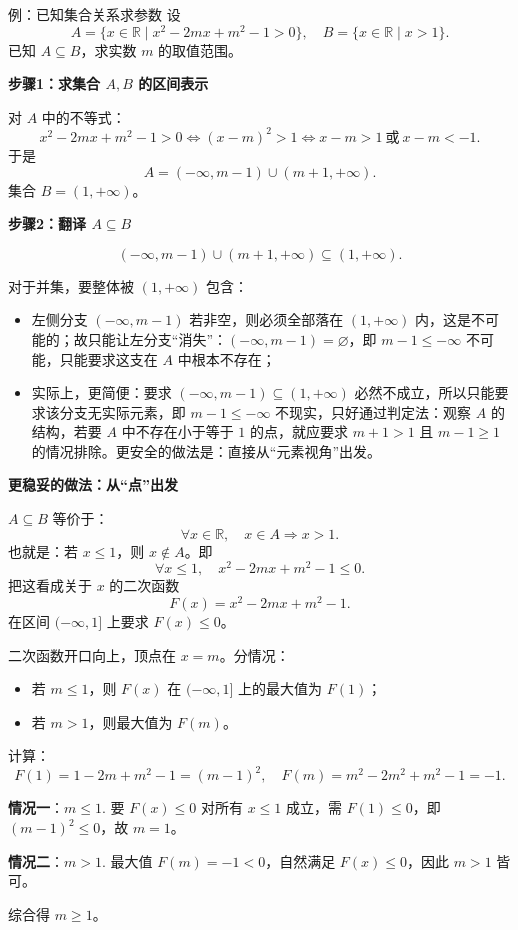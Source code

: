 \documentclass[a4paper,11pt]{ctexart}
\begin{document}
\begin{examplebox}[mathnote coverage=soft]{例：已知集合关系求参数}
设
\[
A=\{x\in\mathbb{R}\mid x^2-2mx+m^2-1>0\},\quad
B=\{x\in\mathbb{R}\mid x>1\}.
\]
已知 $A\subseteq B$，求实数 $m$ 的取值范围。

\textbf{步骤1：求集合 $A,B$ 的区间表示}

对 $A$ 中的不等式：
\[
x^2-2mx+m^2-1>0
\iff (x-m)^2>1
\iff x-m>1\ \text{或}\ x-m<-1.
\]
于是
\[
A=(-\infty,m-1)\cup(m+1,+\infty).
\]
集合 $B=(1,+\infty)$。

\textbf{步骤2：翻译 $A\subseteq B$}

\[
(-\infty,m-1)\cup(m+1,+\infty)\subseteq(1,+\infty).
\]

对于并集，要整体被 $(1,+\infty)$ 包含：
\begin{itemize}
  \item 左侧分支 $(-\infty,m-1)$ 若非空，则必须全部落在 $(1,+\infty)$ 内，这是不可能的；故只能让左分支“消失”：$(-\infty,m-1)=\varnothing$，即 $m-1\le -\infty$ 不可能，只能要求这支在 $A$ 中根本不存在；
  \item 实际上，更简便：要求 $(-\infty,m-1)\subseteq(1,+\infty)$ 必然不成立，所以只能要求该分支无实际元素，即 $m-1\le -\infty$ 不现实，只好通过判定法：观察 $A$ 的结构，若要 $A$ 中不存在小于等于 $1$ 的点，就应要求 $m+1>1$ 且 $m-1\ge 1$ 的情况排除。更安全的做法是：直接从“元素视角”出发。
\end{itemize}

\textbf{更稳妥的做法：从“点”出发}

$A\subseteq B$ 等价于：
\[
\forall x\in\mathbb{R},\quad x\in A\Rightarrow x>1.
\]
也就是：若 $x\le 1$，则 $x\notin A$。即
\[
\forall x\le 1,\quad x^2-2mx+m^2-1\le 0.
\]
把这看成关于 $x$ 的二次函数
\[
F(x)=x^2-2mx+m^2-1.
\]
在区间 $(-\infty,1]$ 上要求 $F(x)\le 0$。

二次函数开口向上，顶点在 $x=m$。分情况：
\begin{itemize}
  \item 若 $m\le 1$，则 $F(x)$ 在 $(-\infty,1]$ 上的最大值为 $F(1)$；
  \item 若 $m>1$，则最大值为 $F(m)$。
\end{itemize}

计算：
\[
F(1)=1-2m+m^2-1=(m-1)^2,\quad
F(m)=m^2-2m^2+m^2-1=-1.
\]

\textbf{情况一}：$m\le 1$.  
要 $F(x)\le 0$ 对所有 $x\le 1$ 成立，需 $F(1)\le 0$，即 $(m-1)^2\le 0$，故 $m=1$。

\textbf{情况二}：$m>1$.  
最大值 $F(m)=-1<0$，自然满足 $F(x)\le 0$，因此 $m>1$ 皆可。

综合得 $m\ge 1$。
\end{examplebox}
\end{document}
